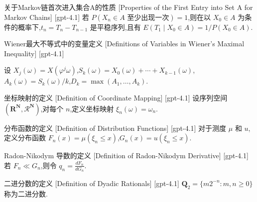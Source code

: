 \documentclass[UTF8]{ctexart}
\begin{document}
    \begin{thm}
        {关于Markov链首次进入集合A的性质}
        [Properties of the First Entry into Set A for Markov Chains]
        [gpt-4.1]
        若 $P(X_{n} \in A \text{ 至少出现一次}) = 1$,则在以 $X_{0} \in A$ 为条件的概率下,$t_{n} = T_{n} - T_{n-1}$ 是平稳序列,且有 $E(T_{1} \mid X_{0} \in A) = 1 / P(X_{0} \in A)$.
    \end{thm}
    
    
    
    \begin{dfn}
        {Wiener最大不等式中的变量定义}
        [Definitions of Variables in Wiener's Maximal Inequality]
        [gpt-4.1]
        
设 $X_{j}(\omega) = X(\varphi^{j} \omega)$,$S_{k}(\omega) = X_{0}(\omega) + \cdots + X_{k-1}(\omega)$,$A_{k}(\omega) = S_{k}(\omega)/k$,$D_{k} = \operatorname*{max}(A_{1}, \ldots, A_{k})$.

    \end{dfn}
    
    
    
    \begin{dfn}
        {坐标映射的定义}
        [Definition of Coordinate Mapping]
        [gpt-4.1]
        设序列空间 $(\mathbf{R}^{\mathbf{N}}, \mathcal{R}^{\mathbf{N}})$,对每个 $n$,定义坐标映射 $\xi_n(\omega) = \omega_n$.
    \end{dfn}
    
    
    
    \begin{dfn}
        {分布函数的定义}
        [Definition of Distribution Functions]
        [gpt-4.1]
        对于测度 $\mu$ 和 $
u$,定义分布函数 $F_n(x) = \mu(\xi_n \leq x)$,$G_n(x) = 
u(\xi_n \leq x)$.
    \end{dfn}
    
    
    
    \begin{dfn}
        {Radon-Nikodym 导数的定义}
        [Definition of Radon-Nikodym Derivative]
        [gpt-4.1]
        若 $F_n \ll G_n$,则令 $q_n = \frac{dF_n}{dG_n}$.
    \end{dfn}
    
    
    
    \begin{dfn}
        {二进分数的定义}
        [Definition of Dyadic Rationals]
        [gpt-4.1]
        $\mathbf{Q}_2 = \{m 2^{-n} : m, n \geq 0\}$ 称为二进分数.
    \end{dfn}
    
\end{document}
